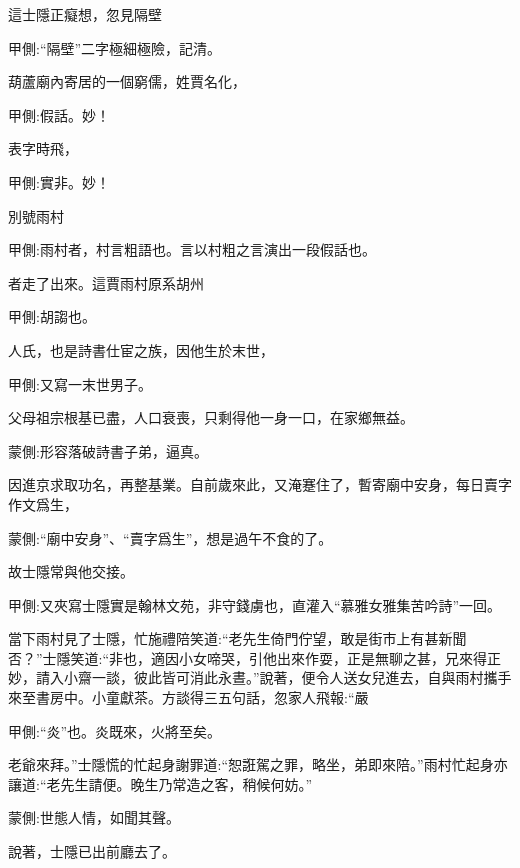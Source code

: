 \begin{parag}
    這士隱正癡想，忽見隔壁\begin{note}甲側:“隔壁”二字極細極險，記清。\end{note}葫蘆廟內寄居的一個窮儒，姓賈名化，\begin{note}甲側:假話。妙！\end{note}表字時飛，\begin{note}甲側:實非。妙！\end{note}別號雨村\begin{note}甲側:雨村者，村言粗語也。言以村粗之言演出一段假話也。\end{note}者走了出來。這賈雨村原系胡州\begin{note}甲側:胡謅也。\end{note}人氏，也是詩書仕宦之族，因他生於末世，\begin{note}甲側:又寫一末世男子。\end{note}父母祖宗根基已盡，人口衰喪，只剩得他一身一口，在家鄉無益。\begin{note}蒙側:形容落破詩書子弟，逼真。\end{note}因進京求取功名，再整基業。自前歲來此，又淹蹇住了，暫寄廟中安身，每日賣字作文爲生，\begin{note}蒙側:“廟中安身”、“賣字爲生”，想是過午不食的了。\end{note}故士隱常與他交接。\begin{note}甲側:又夾寫士隱實是翰林文苑，非守錢虜也，直灌入“慕雅女雅集苦吟詩”一回。\end{note}當下雨村見了士隱，忙施禮陪笑道:“老先生倚門佇望，敢是街市上有甚新聞否？”士隱笑道:“非也，適因小女啼哭，引他出來作耍，正是無聊之甚，兄來得正妙，請入小齋一談，彼此皆可消此永晝。”說著，便令人送女兒進去，自與雨村攜手來至書房中。小童獻茶。方談得三五句話，忽家人飛報:“嚴\begin{note}甲側:“炎”也。炎既來，火將至矣。\end{note}老爺來拜。”士隱慌的忙起身謝罪道:“恕誑駕之罪，略坐，弟即來陪。”雨村忙起身亦讓道:“老先生請便。晚生乃常造之客，稍候何妨。”\begin{note}蒙側:世態人情，如聞其聲。\end{note}說著，士隱已出前廳去了。
\end{parag}


